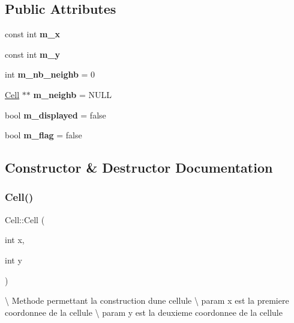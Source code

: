 \subsection*{Public Attributes}
\begin{DoxyCompactItemize}
\item 
\mbox{\label{class_cell_aad0edd318cb8deb1a7375ccd2c50eff2}} 
const int {\bfseries m\+\_\+x}
\item 
\mbox{\label{class_cell_ad8bd81fcd1915ea1ebecb00d36df8ff0}} 
const int {\bfseries m\+\_\+y}
\item 
\mbox{\label{class_cell_a746815d55334d4b4c607c10866ff2586}} 
int {\bfseries m\+\_\+nb\+\_\+neighb} = 0
\item 
\mbox{\label{class_cell_a5b827178447902d04580afe9ecc23df4}} 
\hyperlink{class_cell}{Cell} $\ast$$\ast$ {\bfseries m\+\_\+neighb} = N\+U\+LL
\item 
\mbox{\label{class_cell_a12d1879e5259aa9e1406e07052f9bc00}} 
bool {\bfseries m\+\_\+displayed} = false
\item 
\mbox{\label{class_cell_a5d45f742b4819199b494da7b1417d120}} 
bool {\bfseries m\+\_\+flag} = false
\end{DoxyCompactItemize}


\subsection{Constructor \& Destructor Documentation}
\mbox{\label{class_cell_aa39ad04eeebb7bf00d592ad36640337e}} 
\subsubsection{\texorpdfstring{Cell()}{Cell()}}
{\footnotesize\ttfamily Cell\+::\+Cell (\begin{DoxyParamCaption}\item[{int}]{x,  }\item[{int}]{y }\end{DoxyParamCaption})}

\textbackslash{} Methode permettant la construction d\textquotesingle{}une cellule \textbackslash{} param x est la premiere coordonnee de la cellule \textbackslash{} param y est la deuxieme coordonnee de la cellule\mbox{\label{class_cell_a9fa559f7a28e2b4336c6879ca09304d8}} 

